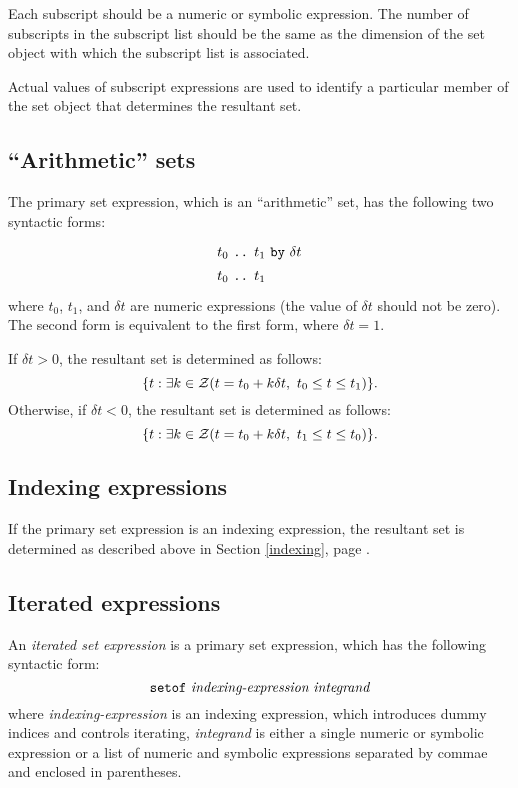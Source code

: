 \documentclass[11pt]{report}
\begin{document}
Each subscript should be a numeric or symbolic expression. The number
of subscripts in the subscript list should be the same as the dimension
of the set object with which the subscript list is associated.

Actual values of subscript expressions are used to identify a
particular member of the set object that determines the resultant set.

\subsection{``Arithmetic'' sets}

The primary set expression, which is an ``arithmetic'' set, has the
following two syntactic forms:
$$
{\def\arraystretch{1.4}
\begin{array}{l}
\mbox{$t_0$ {\tt..} $t_1$ {\tt by} $\delta t$}\\
\mbox{$t_0$ {\tt..} $t_1$}\\
\end{array}
}
$$
where $t_0$, $t_1$, and $\delta t$ are numeric expressions (the value
of $\delta t$ should not be zero). The second form is equivalent to the
first form, where $\delta t=1$.

If $\delta t>0$, the resultant set is determined as follows:
$$\{t:\exists k\in{\cal Z}(t=t_0+k\delta t,\ t_0\leq t\leq t_1)\}.$$
Otherwise, if $\delta t<0$, the resultant set is determined as follows:
$$\{t:\exists k\in{\cal Z}(t=t_0+k\delta t,\ t_1\leq t\leq t_0)\}.$$

\subsection{Indexing expressions}

If the primary set expression is an indexing expression, the resultant
set is determined as described above in Section \ref{indexing}, page
\pageref{indexing}.

\newpage

\subsection{Iterated expressions}

An {\it iterated set expression} is a primary set expression, which has
the following syntactic form:
$$\mbox{{\tt setof} {\it indexing-expression} {\it integrand}}$$
where {\it indexing-expression} is an indexing expression, which
introduces dummy indices and controls iterating, {\it integrand} is
either a single numeric or symbolic expression or a list of numeric and
symbolic expressions separated by commae and enclosed in parentheses.
\end{document}
